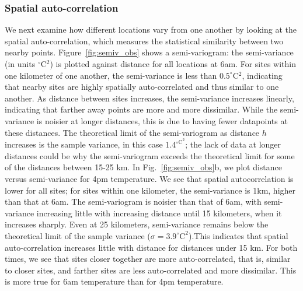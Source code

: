\documentclass[draft,linenumbers]{agujournal}
\begin{document}
\subsubsection{Spatial auto-correlation}
We next examine how different locations vary from one another by looking at the spatial auto-correlation, which measures the statistical similarity between two nearby points. Figure~\ref{fig:semiv_obs} shows a semi-variogram: the semi-variance (in units $^\circ$C$^2$) is plotted against distance for all locations at 6am. For sites within one kilometer of one another, the semi-variance is less than $0.5^\circ$C$^2$, indicating that nearby sites are highly spatially auto-correlated and thus similar to one another. 
As distance between sites increases, the semi-variance increases linearly, indicating that farther away points are more and more dissimilar. While the semi-variance is noisier at longer distances, this is due to having fewer datapoints at these distances. 
The theoretical limit of the semi-variogram as distance $h$ increases is the sample variance, in this case $1.4^{\circ \text{C} ^2}$; the lack of data at longer distances could be why the semi-variogram exceeds the theoretical limit for some of the distances between 15-25 km. 
In Fig.~\ref{fig:semiv_obs}b, we plot distance versus semi-variance for 4pm temperature. We see that spatial autocorrelation is lower for all sites; for sites within one kilometer, the semi-variance is 1km, higher than that at 6am. The semi-variogram is noisier than that of 6am, with semi-variance increasing little with increasing distance until 15 kilometers, when it increases sharply. Even at 25 kilometers, semi-variance remains below the theoretical limit of the sample variance ($\sigma = 3.9^\circ \text{C}^2$).This indicates that spatial auto-correlation increases little with distance for distances under 15 km.
For both times, we see that sites closer together are more auto-correlated, that is, similar to closer sites, and farther sites are less auto-correlated and more dissimilar. This is more true for 6am temperature than for 4pm temperature. 
\end{document}
